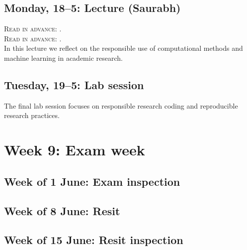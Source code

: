 \subsection*{Monday, 18--5: Lecture (Saurabh)}

\textsc{ Read in advance: \cite{hube_understanding_2019}.}\\
\textsc{ Read in advance: \cite{bender_dangers_2021}.}\\

In this lecture we reflect on the responsible use of computational methods and machine learning in academic research.

\subsection*{Tuesday, 19--5: Lab session}

The final lab session focuses on responsible research coding and reproducible research practices.

\section*{Week 9: Exam week}

\subsection*{Week of 1 June: Exam inspection}

\subsection*{Week of 8 June: Resit}

\subsection*{Week of 15 June: Resit inspection}